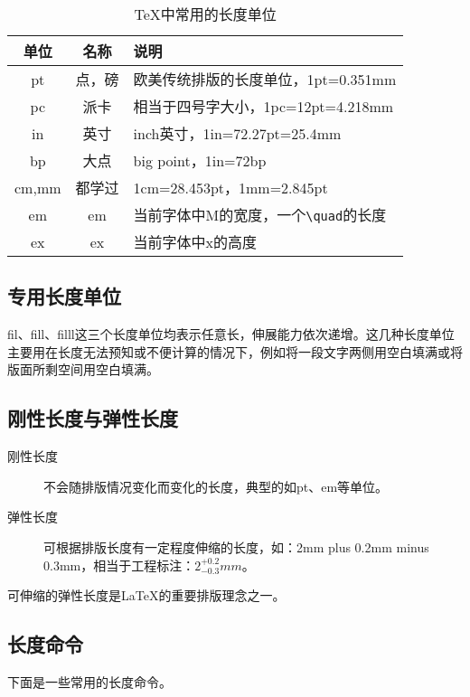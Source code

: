 \begin{table}[!htb]
    \centering
    \caption{\TeX 中常用的长度单位}
    \label{TeX-length}
    \begin{tabular}{ccl}
        \toprule
        单位 & 名称 & 说明\\
        \midrule
        pt & 点，磅 & 欧美传统排版的长度单位，1pt=0.351mm\\
        pc & 派卡 & 相当于四号字大小，1pc=12pt=4.218mm\\
        in & 英寸 & inch英寸，1in=72.27pt=25.4mm\\
        bp & 大点 & big point，1in=72bp\\
        cm,mm & 都学过 & 1cm=28.453pt，1mm=2.845pt\\
        em & em & 当前字体中M的宽度，一个\lstinline|\quad|的长度\\
        ex & ex & 当前字体中x的高度\\
        \bottomrule
    \end{tabular}
\end{table}

\subsection*{专用长度单位}
fil、fill、filll这三个长度单位均表示任意长，伸展能力依次递增。这几种长度单位主要用在长度无法预知或不便计算的情况下，例如将一段文字两侧用空白填满或将版面所剩空间用空白填满。

\subsection*{刚性长度与弹性长度}

\begin{description}
    \item[刚性长度] 不会随排版情况变化而变化的长度，典型的如pt、em等单位。
    \item[弹性长度] 可根据排版长度有一定程度伸缩的长度，如：2mm plus 0.2mm minus 0.3mm，相当于工程标注：$ 2^{+0.2}_{-0.3}mm $。
\end{description}

可伸缩的弹性长度是\LaTeX 的重要排版理念之一。

\subsection*{长度命令}
下面是一些常用的长度命令。

